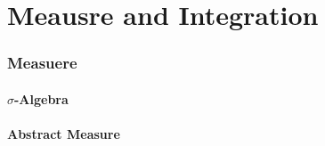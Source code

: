 \part{Meausre and Integration}

\section{Measuere}

\subsection{\texorpdfstring{\(\sigma\)}{sigma}-Algebra}

\subsection{Abstract Measure}